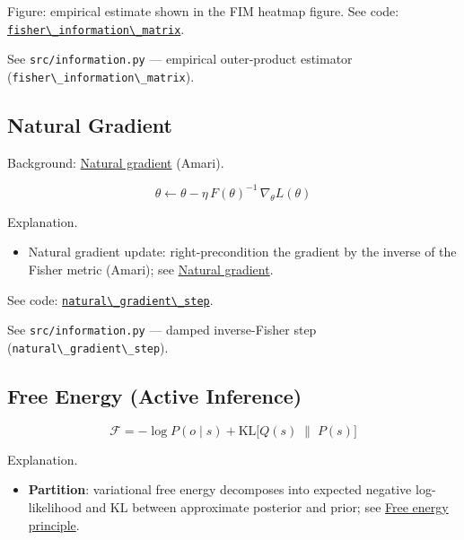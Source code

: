 \documentclass[
  10pt,
]{article}
\newcommand{\passthrough}[1]{#1}
\providecommand{\tightlist}{%
  \setlength{\itemsep}{0pt}\setlength{\parskip}{0pt}}
\begin{document}
Figure: empirical estimate shown in the FIM heatmap figure. See code:
\href{03_quadray_methods.md\#code:fisher_information_matrix}{\passthrough{\lstinline!fisher\_information\_matrix!}}.

See \passthrough{\lstinline!src/information.py!} --- empirical
outer-product estimator
(\passthrough{\lstinline!fisher\_information\_matrix!}).

\hypertarget{eq:natgrad}{%
\subsection{Natural Gradient}\label{eq:natgrad}}

Background:
\href{https://en.wikipedia.org/wiki/Natural_gradient}{Natural gradient}
(Amari).

\begin{equation}\label{eq:supp_natgrad}
\theta \leftarrow \theta - \eta\, F(\theta)^{-1}\, \nabla_{\theta} L(\theta)
\end{equation}

Explanation.

\begin{itemize}
\tightlist
\item
  Natural gradient update: right-precondition the gradient by the
  inverse of the Fisher metric (Amari); see
  \href{https://en.wikipedia.org/wiki/Natural_gradient}{Natural
  gradient}.
\end{itemize}

See code:
\href{03_quadray_methods.md\#code:natural_gradient_step}{\passthrough{\lstinline!natural\_gradient\_step!}}.

See \passthrough{\lstinline!src/information.py!} --- damped
inverse-Fisher step (\passthrough{\lstinline!natural\_gradient\_step!}).

\hypertarget{eq:free_energy}{%
\subsection{Free Energy (Active Inference)}\label{eq:free_energy}}

\begin{equation}\label{eq:supp_free_energy}
\mathcal{F} = -\log P(o\mid s) + \mathrm{KL}\big[ Q(s)\;\|\; P(s) \big]
\end{equation}

Explanation.

\begin{itemize}
\tightlist
\item
  \textbf{Partition}: variational free energy decomposes into expected
  negative log-likelihood and KL between approximate posterior and
  prior; see
  \href{https://en.wikipedia.org/wiki/Free_energy_principle}{Free energy
  principle}.
\end{itemize}
\end{document}
